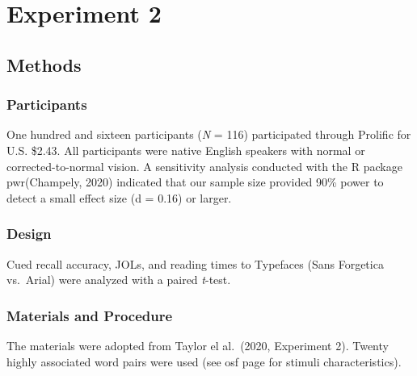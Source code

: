 \documentclass[
  english,
  jou]{apa6}
\begin{document}
\hypertarget{experiment-2}{%
\section{Experiment 2}\label{experiment-2}}

\hypertarget{methods}{%
\subsection{Methods}\label{methods}}

\hypertarget{participants-1}{%
\subsubsection{Participants}\label{participants-1}}

One hundred and sixteen participants (\emph{N} = 116) participated through Prolific for U.S. \$2.43. All participants were native English speakers with normal or corrected-to-normal vision. A sensitivity analysis conducted with the R package pwr(Champely, 2020) indicated that our sample size provided 90\% power to detect a small effect size (d = 0.16) or larger.

\hypertarget{design-1}{%
\subsubsection{Design}\label{design-1}}

Cued recall accuracy, JOLs, and reading times to Typefaces (Sans Forgetica vs.~Arial) were analyzed with a paired \emph{t}-test.

\hypertarget{materials-and-procedure}{%
\subsubsection{Materials and Procedure}\label{materials-and-procedure}}

The materials were adopted from Taylor el al.~(2020, Experiment 2). Twenty highly associated word pairs were used (see osf page for stimuli characteristics).
\end{document}
